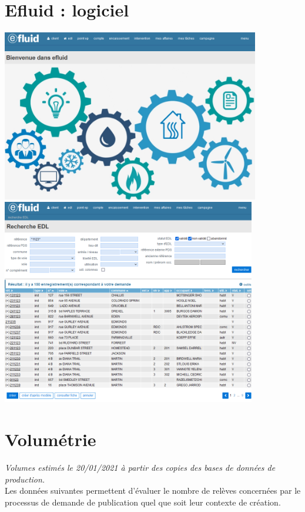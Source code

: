\documentclass[a4paper, 12pt]{report}
\begin{document}
\chapter{Efluid : logiciel}
\label{appendix:logiciel}

\begin{center}
  \includegraphics[height=7.5cm]{../res/efluid-1.png}
  \null
  \vspace{0.3cm}
  \includegraphics[height=9cm]{../res/efluid-2.png}
\end{center}

\chapter{Volumétrie}
\label{appendix:volumetrie}

\textit{Volumes estimés le 20/01/2021 à partir des copies des bases de données de production.}\\

Les données suivantes permettent d’évaluer le nombre de relèves concernées par le processus de demande de publication quel que soit leur contexte de création.\\
\end{document}
